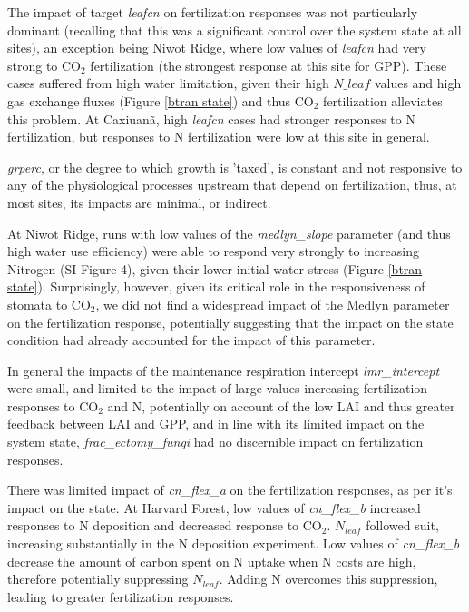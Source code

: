 \usepackage{}\documentclass[draft,linenumbers]{agujournal}
\begin{document}
The impact of target \emph{leafcn} on fertilization responses was not particularly dominant (recalling that this was a significant control over the system state at all sites), an exception being Niwot Ridge, where low values of \emph{leafcn} had very strong to CO$_{2}$ fertilization (the strongest response at this site for GPP). These cases suffered from high water limitation, given their high $N\_{leaf}$ values and high gas exchange fluxes (Figure \ref{btran state}) and thus CO$_{2}$ fertilization alleviates this problem. At Caxiuan\~a, high \emph{leafcn} cases had stronger responses to N fertilization, but responses to N fertilization were low at this site in general.  

\emph{grperc}, or the degree to which growth is 'taxed', is constant and not responsive to any of the physiological processes upstream that depend on fertilization, thus, at most sites, its impacts are minimal, or indirect. 

At Niwot Ridge, runs with low values of the \emph{medlyn\_slope} parameter (and thus high water use efficiency) were able to respond very strongly to increasing Nitrogen (SI Figure 4), given their lower initial water stress (Figure \ref{btran state}). Surprisingly, however, given its critical role in the responsiveness of stomata to CO$_{2}$, we did not find a widespread impact of the Medlyn parameter on the fertilization response, potentially suggesting that the impact on the state condition had already accounted for the impact of this parameter. 

In general the impacts of the maintenance respiration intercept \emph{lmr\_intercept} were small, and limited to the impact of large values increasing fertilization responses to CO$_{2}$ and N, potentially on account of the low LAI and thus greater feedback between LAI and GPP, and in line with its limited impact on the system state, \emph{frac\_ectomy\_fungi} had no discernible impact on fertilization responses. 

There was limited impact of \emph{cn\_flex\_a} on the fertilization responses, as per it's impact on the state.  At Harvard Forest, low values of  \emph{cn\_flex\_b} increased responses to N deposition and decreased response to CO$_{2}$. $N_{leaf}$ followed suit, increasing substantially in the N deposition experiment. Low values of \emph{cn\_flex\_b} decrease the amount of carbon spent on N uptake when N costs are high, therefore potentially suppressing $N_{leaf}$. Adding N overcomes this suppression, leading to greater fertilization responses.
\end{document}
